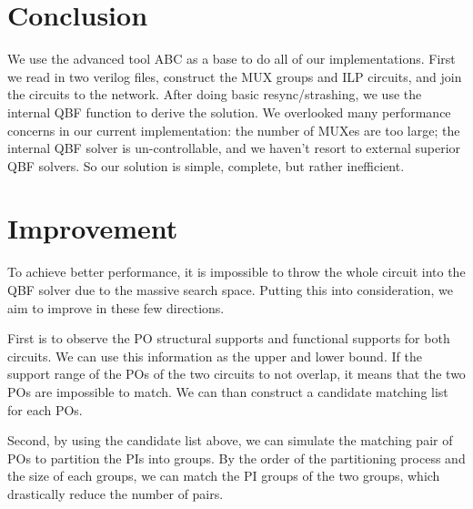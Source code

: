 \section{Conclusion}
We use the advanced tool ABC as a base to do all of our implementations. First we read in two verilog files, construct the MUX groups and ILP circuits, and join the circuits to the network. After doing basic resync/strashing, we use the internal QBF function to derive the solution.
We overlooked many performance concerns in our current implementation: the number of MUXes are too large; the internal QBF solver is un-controllable, and we haven't resort to external superior QBF solvers.
So our solution is simple, complete, but rather inefficient.

\section{Improvement}
To achieve better performance, it is impossible to throw the whole circuit into the QBF solver due to the massive search space. Putting this into consideration, we aim to improve in these few directions.

First is to observe the PO structural supports and functional supports for both circuits. We can use this information as the upper and lower bound. If the support range of the POs of the two circuits to not overlap, it means that the two POs are impossible to match. We can than construct a candidate matching list for each POs.

Second, by using the candidate list above, we can simulate the matching pair of POs to partition the PIs into groups. By the order of the partitioning process and the size of each groups, we can match the PI groups of the two groups, which drastically reduce the number of pairs.

